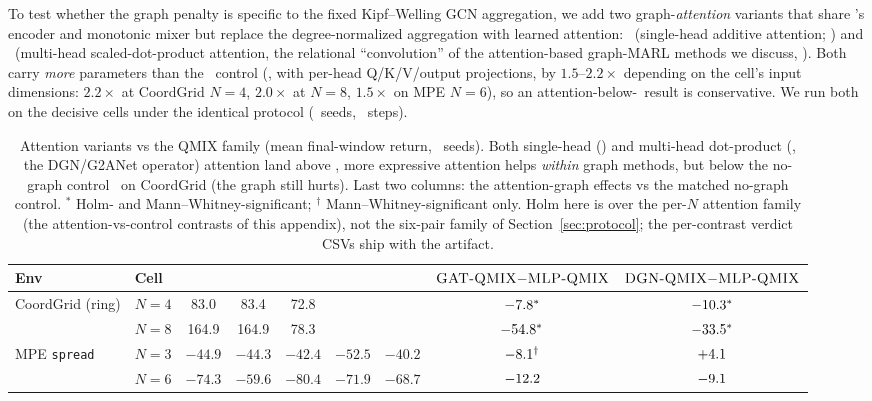 \begin{appendices}
To test whether the graph penalty is specific to the fixed Kipf--Welling
GCN aggregation, we add two graph-\emph{attention} variants that share
\gnnqmix's encoder and monotonic mixer but replace the degree-normalized
aggregation with learned attention: \gatqmix\ (single-head additive
attention; \citealp{velickovic_2018_gat}) and \dgnqmix\ (multi-head
scaled-dot-product attention, the relational ``convolution'' of the
attention-based graph-MARL methods we discuss,
\citealp{jiang_2020_dgn,liu_2020_g2anet}). Both carry \emph{more}
parameters than the \mlpqmix\ control (\dgnqmix, with per-head
Q/K/V/output projections, by $1.5$--$2.2\times$ depending on the cell's
input dimensions: $2.2\times$ at CoordGrid $N{=}4$, $2.0\times$ at $N{=}8$,
$1.5\times$ on MPE $N{=}6$), so an
attention-below-\mlpqmix\ result is conservative. We run both on the
decisive cells under the identical protocol (\PEseeds\ seeds, \PEsteps\
steps).


\begin{table}
  \centering
  \tiny
  \caption{Attention variants vs the QMIX family (mean final-window return,
  \PEseeds\ seeds). Both single-head (\gatqmix) and multi-head dot-product
  (\dgnqmix, the DGN/G2ANet operator) attention land above \gnnqmix, more expressive attention helps \emph{within} graph methods, but below
  the no-graph control \mlpqmix\ on CoordGrid (the graph still hurts). Last
  two columns: the attention-graph effects vs the matched no-graph control.
  ${}^\ast$ Holm- and Mann--Whitney-significant; ${}^\dagger$
  Mann--Whitney-significant only. Holm here is over the per-$N$ attention
  family (the attention-vs-control contrasts of this appendix), not the
  six-pair family of Section~\ref{sec:protocol}; the per-contrast verdict
  CSVs ship with the artifact.}
  \label{tab:gat}
  {
  \begin{tabular}{llccccccc}
    \toprule
    Env & Cell & \qmix & \mlpqmix & \gnnqmix & \gatqmix & \dgnqmix
        & $\textsc{GAT-QMIX}{-}\textsc{MLP-QMIX}$ & $\textsc{DGN-QMIX}{-}\textsc{MLP-QMIX}$ \\
    \midrule
    CoordGrid (ring) & $N=4$ & 83.0 & 83.4 & 72.8 & \PGgatCGNfour & \PGdgnCGNfour
        & $-7.8^\ast$ & $-10.3^\ast$ \\
                     & $N=8$ & 164.9 & 164.9 & 78.3 & \PGgatCGNeight & \PGdgnCGNeight
        & $-54.8^\ast$ & $-33.5^\ast$ \\
    MPE \texttt{spread} & $N=3$ & $-44.9$ & $-44.3$ & $-42.4$ & $-52.5$ & $-40.2$
        & $-8.1^\dagger$ & $+4.1$ \\
                     & $N=6$ & $-74.3$ & $-59.6$ & $-80.4$ & $-71.9$ & $-68.7$
                & $-12.2$ & $-9.1$ \\
    \bottomrule
  \end{tabular}}
\end{table}


\end{appendices}

